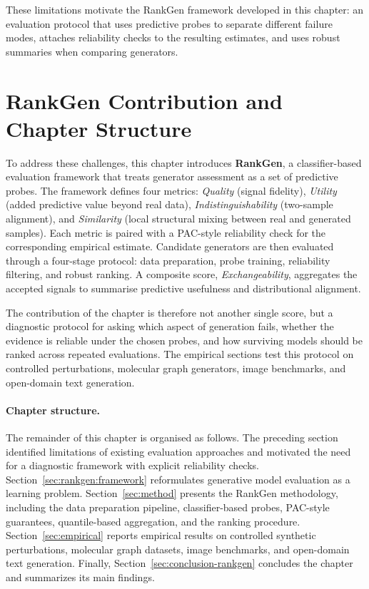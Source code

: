 These limitations motivate the RankGen framework developed in this chapter:
an evaluation protocol that uses predictive probes to separate different
failure modes, attaches reliability checks to the resulting estimates, and
uses robust summaries when comparing generators.

\section{RankGen Contribution and Chapter Structure}
To address these challenges, this chapter introduces \textbf{RankGen}, a
classifier-based evaluation framework that treats generator assessment as a
set of predictive probes. The framework defines four metrics: \emph{Quality}
(signal fidelity), \emph{Utility} (added predictive value beyond real data),
\emph{Indistinguishability} (two-sample alignment), and \emph{Similarity}
(local structural mixing between real and generated samples). Each metric is
paired with a PAC-style reliability check for the corresponding empirical
estimate. Candidate generators are then evaluated through a four-stage
protocol: data preparation, probe training, reliability filtering, and robust
ranking. A composite score, \emph{Exchangeability}, aggregates the accepted
signals to summarise predictive usefulness and distributional alignment.

The contribution of the chapter is therefore not another single score, but a
diagnostic protocol for asking which aspect of generation fails, whether the
evidence is reliable under the chosen probes, and how surviving models should
be ranked across repeated evaluations. The empirical sections test this
protocol on controlled perturbations, molecular graph generators, image
benchmarks, and open-domain text generation.

\paragraph{Chapter structure.}
The remainder of this chapter is organised as follows. The preceding section
identified limitations of existing evaluation approaches and motivated the need
for a diagnostic framework with explicit reliability checks.
Section~\ref{sec:rankgen:framework} reformulates generative model evaluation
as a learning problem.
Section~\ref{sec:method} presents the RankGen methodology, including the data
preparation pipeline, classifier-based probes, PAC-style guarantees,
quantile-based aggregation, and the ranking procedure.
Section~\ref{sec:empirical} reports empirical results on controlled synthetic
perturbations, molecular graph datasets, image benchmarks, and open-domain
text generation.
Finally, Section~\ref{sec:conclusion-rankgen} concludes the chapter and
summarizes its main findings.



